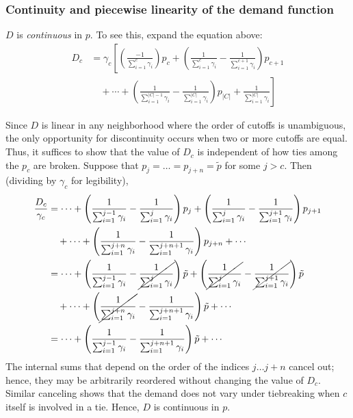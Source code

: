 \documentclass[12pt]{article}
\theoremstyle{definition}
\begin{document}
\subsubsection{Continuity and piecewise linearity of the demand function}
$D$ is \emph{continuous} in $p$. To see this, expand the equation above:
\begin{align}D_c &= \gamma_c \left[
\left( \frac{-1}{\sum_{i=1}^c \gamma_i}\right) p_c
+ \left(\frac{1}{\sum_{i=1}^{c} \gamma_i} - \frac{1}{\sum_{i=1}^{c+1} \gamma_i} \right) p_{c+1}
\right. \\ &\left.
\quad + \cdots
+ \left(\frac{1}{\sum_{i=1}^{|C|-1} \gamma_i} - \frac{1}{\sum_{i=1}^{|C|} \gamma_i}\right) p_{|C|}
+ \frac{1}{\sum_{i=1}^{|C|} \gamma_i}
\right]
\end{align}

Since $D$ is linear in any neighborhood where the order of cutoffs is unambiguous, the only opportunity for discontinuity occurs when two or more cutoffs are equal. Thus, it suffices to show that the value of $D_c$ is independent of how ties among the $p_c$ are broken. Suppose that $p_j = \dots = p_{j+n} = \tilde p$ for some $j > c$. Then (dividing by $\gamma_c$ for legibility),
\begin{align}
\frac{D_c}{\gamma_c} &= \cdots
+ \left(\frac{1}{\sum_{i=1}^{j-1} \gamma_i} - \frac{1}{\sum_{i=1}^{j} \gamma_i} \right) p_{j}
+ \left(\frac{1}{\sum_{i=1}^{j} \gamma_i} - \frac{1}{\sum_{i=1}^{j+1} \gamma_i} \right) p_{j+1}
 \\ &\quad + \cdots
+ \left(\frac{1}{\sum_{i=1}^{j+n} \gamma_i} - \frac{1}{\sum_{i=1}^{j+n+1} \gamma_i}\right) p_{j+n}
+ \cdots \\
&= \cdots
+ \left(\frac{1}{\sum_{i=1}^{j-1} \gamma_i} - \cancel{\frac{1}{\sum_{i=1}^{j} \gamma_i}} \right) \tilde p
+ \left(\cancel{\frac{1}{\sum_{i=1}^{j} \gamma_i}} - \cancel{\frac{1}{\sum_{i=1}^{j+1} \gamma_i}} \right) \tilde p
\\ &\quad  + \cdots
+ \left(\cancel{\frac{1}{\sum_{i=1}^{j+n} \gamma_i}} - \frac{1}{\sum_{i=1}^{j+n+1} \gamma_i}\right) \tilde p
+ \cdots \\
&= \cdots
+ \left(\frac{1}{\sum_{i=1}^{j-1} \gamma_i} - \frac{1}{\sum_{i=1}^{j+n+1} \gamma_i}\right) \tilde p
+ \cdots
\end{align}
The internal sums that depend on the order of the indices $j \dots j+n$ cancel out; hence, they may be arbitrarily reordered without changing the value of $D_c$. Similar canceling shows that the demand does not vary under tiebreaking when $c$ itself is involved in a tie. Hence, $D$ is continuous in $p$. 
\end{document}
